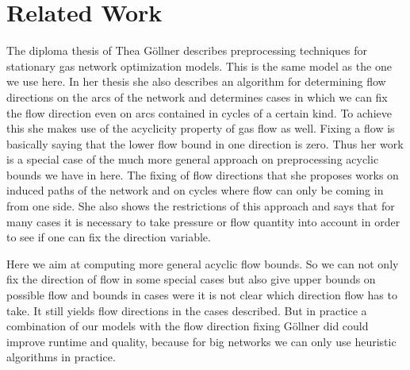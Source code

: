 \section{Related Work}
The diploma thesis of Thea Göllner \cite{DiplomarbeitTheaGoellner} describes preprocessing techniques for stationary gas 
network optimization models. This is the same model as the one we use here. In her thesis she also describes an 
algorithm for determining flow directions on the arcs of the network and determines cases in which we can fix the flow 
direction even on arcs contained in cycles of a certain kind. To achieve this she makes use of the acyclicity property 
of gas flow as well. 
Fixing a flow is basically saying that the lower flow bound in one direction is zero. Thus her work is a special case 
of the much more general approach on preprocessing acyclic bounds we have in here. The fixing of flow directions that 
she proposes works on induced paths of the network and on cycles where flow can only be coming in from one side. 
She also shows the restrictions of this approach and says that for many cases it is necessary to take pressure or flow 
quantity into account in order to see if one can fix the direction variable. 

Here we aim at computing more general acyclic flow bounds. So we can not only fix the direction of flow in some special 
cases but also give upper bounds on possible flow and bounds in cases were it is not clear which direction flow has to 
take. It still yields flow directions in the cases described. But in practice a combination of our models with the 
flow direction fixing Göllner did could improve runtime and quality, because for big networks we can only use heuristic 
algorithms in practice.
